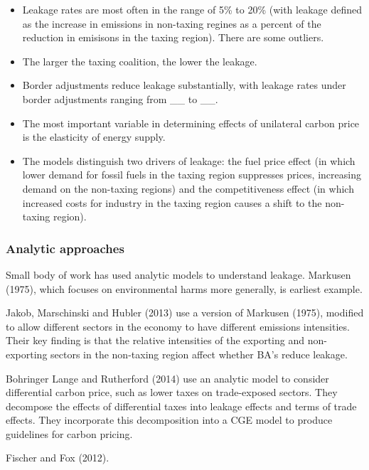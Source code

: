 \documentclass[notitlepage,12pt]{article}
\begin{document}
\begin{itemize}
\item Leakage rates are most often in the range of 5\% to 20\% (with leakage
defined as the increase in emissions in non-taxing regines as a percent of
the reduction in emisisons in the taxing region). There are some outliers.

\item The larger the taxing coalition, the lower the leakage.

\item Border adjustments reduce leakage substantially, with leakage rates
under border adjustments ranging from \_\_ to \_\_. 

\item The most important variable in determining effects of unilateral
carbon price is the elasticity of energy supply.

\item The models distinguish two drivers of leakage: the fuel price effect
(in which lower demand for fossil fuels in the taxing region suppresses
prices, increasing demand on the non-taxing regions) and the competitiveness
effect (in which increased costs for industry in the taxing region causes a
shift to the non-taxing region).
\end{itemize}

\subsubsection{Analytic approaches}

Small body of work has used analytic models to understand leakage. Markusen
(1975), which focuses on environmental harms more generally, is earliest
example.

Jakob, Marschinski and Hubler (2013) use a version of Markusen (1975),
modified to allow different sectors in the economy to have different
emissions intensities. Their key finding is that the relative intensities of
the exporting and non-exporting sectors in the non-taxing region affect
whether BA's reduce leakage.

Bohringer Lange and Rutherford (2014) use an analytic model to consider
differential carbon price, such as lower taxes on trade-exposed sectors.
They decompose the effects of differential taxes into leakage effects and
terms of trade effects. They incorporate this decomposition into a CGE model
to produce guidelines for carbon pricing.

Fischer and Fox (2012).
\end{document}
